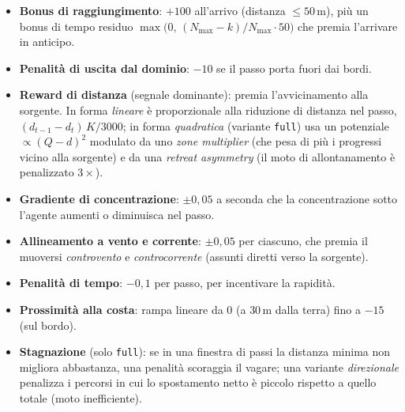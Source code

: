 \begin{itemize}[leftmargin=1.4em, itemsep=2pt]
  \item \textbf{Bonus di raggiungimento}: $+100$ all'arrivo (distanza $\leq 50\,$m), pi\`u un
        bonus di tempo residuo $\max\!\big(0,\,(N_{\max}-k)/N_{\max}\cdot 50\big)$ che premia
        l'arrivare in anticipo.
  \item \textbf{Penalit\`a di uscita dal dominio}: $-10$ se il passo porta fuori dai bordi.
  \item \textbf{Reward di distanza} (segnale dominante): premia l'avvicinamento alla sorgente.
        In forma \emph{lineare} \`e proporzionale alla riduzione di distanza nel passo,
        $(d_{t-1}-d_t)\,K/3000$; in forma \emph{quadratica} (variante \texttt{full}) usa un
        potenziale $\propto(Q-d)^2$ modulato da uno \emph{zone multiplier} (che pesa di pi\`u i
        progressi vicino alla sorgente) e da una \emph{retreat asymmetry} (il moto di
        allontanamento \`e penalizzato $3\times$).
  \item \textbf{Gradiente di concentrazione}: $\pm 0{,}05$ a seconda che la concentrazione
        sotto l'agente aumenti o diminuisca nel passo.
  \item \textbf{Allineamento a vento e corrente}: $\pm 0{,}05$ per ciascuno, che premia il
        muoversi \emph{controvento} e \emph{controcorrente} (assunti diretti verso la sorgente).
  \item \textbf{Penalit\`a di tempo}: $-0{,}1$ per passo, per incentivare la rapidit\`a.
  \item \textbf{Prossimit\`a alla costa}: rampa lineare da $0$ (a $30\,$m dalla terra) fino a
        $-15$ (sul bordo).
  \item \textbf{Stagnazione} (solo \texttt{full}): se in una finestra di passi la distanza
        minima non migliora abbastanza, una penalit\`a scoraggia il vagare; una variante
        \emph{direzionale} penalizza i percorsi in cui lo spostamento netto \`e piccolo
        rispetto a quello totale (moto inefficiente).
\end{itemize}

